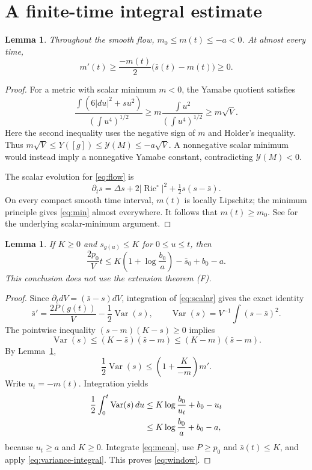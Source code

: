 \documentclass[11pt]{article}
\newtheorem{lemma}[theorem]{Lemma}
\theoremstyle{remark}\newtheorem{remark}[theorem]{Remark}
\newcommand{\Ric}{\operatorname{Ric}}
\newcommand{\Var}{\operatorname{Var}}
\newcommand{\Yam}{\mathcal Y}
\begin{document}
\section{A finite-time integral estimate}
\begin{lemma}\label{lem:min}
Throughout the smooth flow, $m_0\le m(t)\le-a<0$. At almost every time,
\begin{equation}
 m'(t)\ge\frac{-m(t)}2\bigl(\bar s(t)-m(t)\bigr)\ge0.
 \label{eq:min}
\end{equation}
\end{lemma}
\begin{proof}
For a metric with scalar minimum $m<0$, the Yamabe quotient satisfies
\[
 \frac{\int(6|du|^2+s u^2)}{(\int u^4)^{1/2}}
 \ge m\frac{\int u^2}{(\int u^4)^{1/2}}
 \ge m\sqrt V.
\]
Here the second inequality uses the negative sign of $m$ and Holder's
inequality. Thus $m\sqrt V\le Y([g])\le\Yam(M)\le-a\sqrt V$.
A nonnegative scalar minimum would instead imply a nonnegative Yamabe
constant, contradicting $\Yam(M)<0$.

The scalar evolution for \eqref{eq:flow} is
\begin{equation}
 \partial_ts=\Delta s+2|\Ric^\circ|^2+\tfrac12s(s-\bar s).
 \label{eq:scalar}
\end{equation}
On every compact smooth time interval, $m(t)$ is locally Lipschitz;
the minimum principle gives \eqref{eq:min} almost everywhere.
It follows that $m(t)\ge m_0$. See \cite[Sections 2--3]{Ishida}
for the underlying scalar-minimum argument.
\end{proof}

\begin{lemma}\label{lem:integral}
If $K\ge0$ and $s_{g(u)}\le K$ for $0\le u\le t$, then
\begin{equation}
 \frac{2p_0}{V}t\le
 K\left(1+\log\frac{b_0}{a}\right)-\bar s_0+b_0-a.
 \label{eq:window}
\end{equation}
This conclusion does not use the extension theorem (F).
\end{lemma}
\begin{proof}
Since $\partial_t dV=(\bar s-s)dV$, integration of
\eqref{eq:scalar} gives the exact identity
\begin{equation}
 \bar s'=\frac{2P(g(t))}{V}-\frac12\Var(s),
 \qquad \Var(s)=V^{-1}\int(s-\bar s)^2.
 \label{eq:mean}
\end{equation}
The pointwise inequality $(s-m)(K-s)\ge0$ implies
\[
 \Var(s)\le(K-\bar s)(\bar s-m)
             \le(K-m)(\bar s-m).
\]
By Lemma~\ref{lem:min},
\[
 \frac12\Var(s)\le\left(1+\frac{K}{-m}\right)m'.
\]
Write $u_t=-m(t)$. Integration yields
\begin{align}
 \frac12\int_0^t\Var(s)\,du
 &\le K\log\frac{b_0}{u_t}+b_0-u_t\notag\\
 &\le K\log\frac{b_0}{a}+b_0-a,\label{eq:variance-integral}
\end{align}
because $u_t\ge a$ and $K\ge0$.
Integrate \eqref{eq:mean}, use $P\ge p_0$ and $\bar s(t)\le K$,
and apply \eqref{eq:variance-integral}. This proves
\eqref{eq:window}.
\end{proof}
\end{document}
